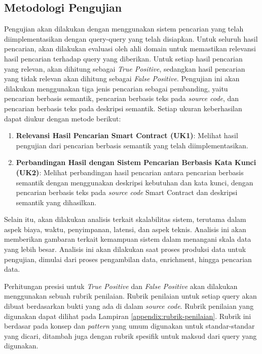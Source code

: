 \subsection{Metodologi Pengujian}

Pengujian akan dilakukan dengan menggunakan sistem pencarian yang telah diimplementasikan dengan query-query yang telah disiapkan. Untuk seluruh hasil pencarian, akan dilakukan evaluasi oleh ahli domain untuk memastikan relevansi hasil pencarian terhadap query yang diberikan. Untuk setiap hasil pencarian yang relevan, akan dihitung sebagai \textit{True Positive}, sedangkan hasil pencarian yang tidak relevan akan dihitung sebagai \textit{False Positive}. Pengujian ini akan dilakukan menggunakan tiga jenis pencarian sebagai pembanding, yaitu pencarian berbasis semantik, pencarian berbasis teks pada \textit{source code}, dan pencarian berbasis teks pada deskripsi semantik. Setiap ukuran keberhasilan dapat diukur dengan metode berikut:

\begin{enumerate}
	\item \textbf{Relevansi Hasil Pencarian Smart Contract (UK1)}: Melihat hasil pengujian dari pencarian berbasis semantik yang telah diimplementasikan. 
	\item \textbf{Perbandingan Hasil dengan Sistem Pencarian Berbasis Kata Kunci (UK2)}: Melihat perbandingan hasil pencarian antara pencarian berbasis semantik dengan menggunakan deskripsi kebutuhan dan kata kunci, dengan pencarian berbasis teks pada \textit{source code} Smart Contract dan deskripsi semantik yang dihasilkan.
\end{enumerate}

Selain itu, akan dilakukan analisis terkait skalabilitas sistem, terutama dalam aspek biaya, waktu, penyimpanan, latensi, dan aspek teknis. Analisis ini akan memberikan gambaran terkait kemampuan sistem dalam menangani skala data yang lebih besar. Analisis ini akan dilakukan saat proses produksi data untuk pengujian, dimulai dari proses pengambilan data, enrichment, hingga pencarian data.

Perhitungan presisi untuk \textit{True Positive} dan \textit{False Positive} akan dilakukan menggunakan sebuah rubrik penilaian. Rubrik penilaian untuk setiap query akan dibuat berdasarkan bukti yang ada di dalam \textit{source code}. Rubrik penilaian yang digunakan dapat dilihat pada Lampiran \ref{appendix:rubrik-penilaian}. Rubrik ini berdasar pada konsep dan \textit{pattern} yang umum digunakan untuk standar-standar yang dicari, ditambah juga dengan rubrik spesifik untuk maksud dari query yang digunakan.